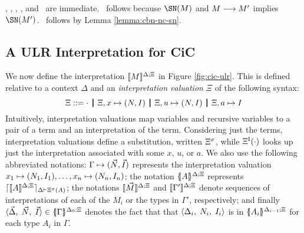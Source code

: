 \documentclass{article}
\begin{document}
\iftechreport
\begin{myproof}
  \CRG, \CRE, \CRT, \CRone, and \CRfour\ are immediate. \CRtwo\
  follows because $\SN(M)$ and $M\rrto M'$ implies $\SN(M')$.
  \CRthree\ follows by Lemma \ref{lemma:cbn-nc-sn}.
\end{myproof}
\fi


\subsection{A ULR Interpretation for CiC}
\label{subsec:interp}

We now define the interpretation $\interp{M}$ in Figure
\ref{fig:cic-ulr}.  This is defined relative to a context $\Delta$
and an \emph{interpretation valuation} $\Xi$ of the following
syntax:
\[
\Xi ::= \cdot \bor \Xi,\dxform{N}{I} \bor \Xi,\duform{N}{I} \bor \Xi,a\mapsto I
\]
Intuitively, interpretation valuations map variables and
recursive variables to a pair of a term and an interpretation
of the term. Considering just the terms, interpretation
valuations define a substitution, written $\Dsubst$,
while $\Dlookup{\cdot}$ looks up just the interpretation associated
with some $x$, $u$, or $a$.
We also use the following abbreviated notations:
$\dgform{\vec{N}}{\vec{I}}$ represents the interpretation
valuation $\dxform[x_1]{N_1}{I_1},\ldots,\dxform[x_n]{N_n}{I_n}$; the notation
$\interpd{A}$ represents $\denotation{\Delta}{\Dsubst(A)}{\interp{A}}$;
the notations $\interp{\vec{M}}$ and
$\interp{\Gamma'}$ denote sequences of interpretations of each of the
$M_i$ or the types in $\Gamma'$, respectively; and finally
$\triple{\vec{\Delta}}{\vec{N}}{\vec{I}}\in\interpd[\iargs{\Delta_0}{\Xi}]{\Gamma}$
denotes the fact that that $\triple{\Delta_i}{N_i}{I_i}$ is in
$\interpd[\iargs{\Delta_{i-1}}{\Xi}]{A_i}$ for each type $A_i$ in
$\Gamma$.


\end{document}

